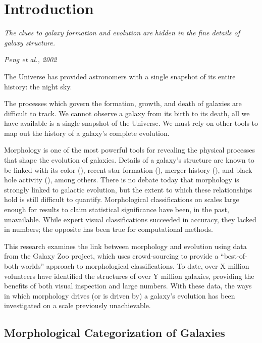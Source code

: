\chapter{Introduction}
\label{chap:intro}
\epigraph{\textit{The clues to galaxy formation and evolution are hidden in the fine details of galaxy structure.}}{\textit{Peng et al., 2002}}

The Universe has provided astronomers with a single snapshot of its entire history: the night sky. 

The processes which govern the formation, growth, and death of galaxies are difficult to track. We cannot observe a galaxy from its birth to its death, all we have available is a single snapshot of the Universe. We must rely on other tools to map out the history of a galaxy's complete evolution.

Morphology is one of the most powerful tools for revealing the physical processes that shape the evolution of galaxies. Details of a galaxy's structure are known to be linked with its color (), recent star-formation (), merger history (), and black hole activity (), among others. There is no debate today that morphology is strongly linked to galactic evolution, but the extent to which these relationships hold is still difficult to quantify. Morphological classifications on scales large enough for results to claim statistical significance have been, in the past, unavailable. While expert visual classifications succeeded in accuracy, they lacked in numbers; the opposite has been true for computational methods. 

This research examines the link between morphology and evolution using data from the Galaxy Zoo project, which uses crowd-sourcing to provide a ``best-of-both-worlds'' approach to morphological classifications. To date, over X million volunteers have identified the structures of over Y million galaxies, providing the benefits of both visual inspection and large numbers. With these data, the ways in which morphology drives (or is driven by) a galaxy's evolution has been investigated on a scale previously unachievable.
 

\section{Morphological Categorization of Galaxies}

